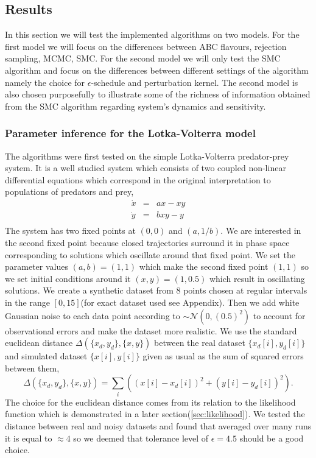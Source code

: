 \documentclass[12pt,a4paper,titlepage]{article}
\begin{document}
\subsection{Results}
In this section we will test the implemented algorithms on two models. For the first model we will focus on the differences between ABC flavours, rejection sampling, MCMC, SMC. For the second model we will only test the SMC algorithm and focus on the differences between different settings of the algorithm namely the choice for $\epsilon$-schedule and perturbation kernel. The second model is also chosen purposefully to illustrate some of the richness of information obtained from the SMC algorithm regarding system's dynamics and sensitivity.

\subsubsection{Parameter inference for the Lotka-Volterra model}
The algorithms were first tested on the simple Lotka-Volterra predator-prey system\cite{lotka1925elements}. It is a well studied system which consists of two coupled non-linear differential equations which correspond in the original interpretation to populations of predators and prey, 
\begin{equation}
\begin{array}{lcl}
\dot x &=& ax - xy \\
\dot y &=& bxy - y \\
\end{array}
\end{equation}
The system has two fixed points at $(0, 0)$ and $(a, 1/b)$. We are interested in the second fixed point because closed trajectories surround it in phase space corresponding to solutions which oscillate around that fixed point. We set the parameter values $(a,b) = (1,1)$ which make the second fixed point $(1, 1)$ so we set initial conditions around it $(x,y) = (1, 0.5)$ which result in oscillating solutions. We create a synthetic dataset from 8 points chosen at regular intervals in the range $[0, 15]$(for exact dataset used see Appendix). Then we add white Gaussian noise to each data point according to $\sim \mathcal{N}(0,(0.5)^2)$ to account for observational errors and make the dataset more realistic. We use the standard euclidean distance $\Delta(\{x_d, y_d\}, \{x, y\})$ between the real dataset $\{x_d[i], y_d[i]\}$ and simulated dataset $\{x[i], y[i]\}$ given as usual as the sum of squared errors between them,
\begin{equation}
\Delta(\{x_d, y_d\}, \{x, y\}) = \sum_{i}\left((x[i] - x_d[i] )^2 + (y[i]-y_d[i])^2\right).
\end{equation}
The choice for the euclidean distance comes from its relation to the likelihood function which is demonstrated in a later section(\ref{sec:likelihood}). We tested the distance between real and noisy datasets and found that averaged over many runs it is equal to $\approx 4$ so we deemed that tolerance level of $\epsilon=4.5$ should be a good choice. 
\end{document}
